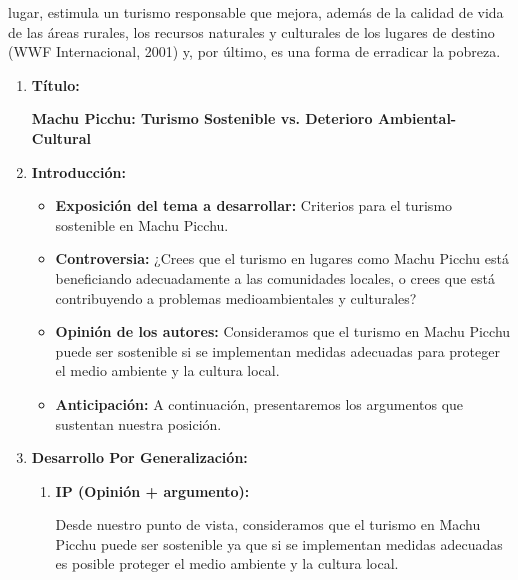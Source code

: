 \documentclass{article}
\begin{document}
lugar, estimula un turismo responsable que mejora, además de la calidad de vida de las áreas rurales, los recursos naturales y culturales de los lugares de destino (WWF Internacional, 2001) y, por último, es una forma de erradicar la pobreza.



\begin{center}
  \begin{enumerate}
    \item \textbf{\large{Título:}}
    
    \textbf{Machu Picchu: Turismo Sostenible vs. Deterioro Ambiental-Cultural}

    \item \textbf{Introducción:}
    \begin{itemize}
      \item \textbf{Exposición del tema a desarrollar:} Criterios para el turismo sostenible en Machu Picchu.
    \end{itemize}
    \begin{itemize}
      \item \textbf{Controversia:} ¿Crees que el turismo en lugares como Machu Picchu está beneficiando adecuadamente a las comunidades locales, o crees que está contribuyendo a problemas medioambientales y culturales?
    \end{itemize}
    \begin{itemize}
      \item \textbf{Opinión de los autores:} Consideramos que el turismo en Machu Picchu puede ser sostenible si se implementan medidas adecuadas para proteger el medio ambiente y la cultura local.
    \end{itemize}
    \begin{itemize}
      \item \textbf{Anticipación:} A continuación, presentaremos los argumentos que sustentan nuestra posición.
    \end{itemize}
    \item \textbf{Desarrollo Por Generalización:}
    \begin{enumerate}
      \item \textbf{IP (Opinión + argumento):} 
      
      Desde nuestro punto de vista, consideramos que el turismo en Machu Picchu puede ser sostenible ya que si se implementan medidas adecuadas es posible proteger el medio ambiente y la cultura local. 


\end{enumerate}
\end{enumerate}
\end{center}
\end{document}
